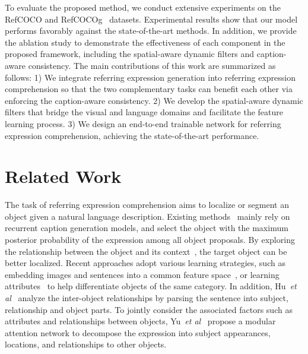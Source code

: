 \documentclass{bmvc2k}
\def\etal{\emph{et al}\bmvaOneDot}
\begin{document}
To evaluate the proposed method, we conduct extensive experiments on the RefCOCO \cite{Yu_ECCV_2016} and RefCOCOg~\cite{Mao_CVPR_2016,Nagaraja_ECCV_2016} datasets.
Experimental results show that our model performs favorably against the state-of-the-art methods.
In addition, we provide the ablation study to demonstrate the effectiveness of each component in the proposed framework, including the spatial-aware dynamic filters and caption-aware consistency.
The main contributions of this work are summarized as follows:
1) We integrate referring expression generation into referring expression comprehension so that the two complementary tasks can benefit each other via enforcing the caption-aware consistency.
2) We develop the spatial-aware dynamic filters that bridge the visual and language domains and facilitate the feature learning process.
3) We design an end-to-end trainable network for referring expression comprehension, achieving the state-of-the-art performance.












\section{Related Work}
{}
The task of referring expression comprehension aims to localize or segment an object given a natural language description.
Existing methods~\cite{Hu_CVPR_2016_2,Luo_CVPR_2017,Mao_CVPR_2016} mainly rely on recurrent caption generation models, and select the object with the maximum posterior probability of the expression among all object proposals.
By exploring the relationship between the object and its context~\cite{Nagaraja_ECCV_2016,Yu_ECCV_2016,Zhang_CVPR_2018}, the target object can be better localized.
Recent approaches adopt various learning strategies, such as embedding images and sentences into a common feature space~\cite{Wang_CVPR_2016,Rohrbach_ECCV_2016},
or learning attributes~\cite{Liu_ICCV_2017_2} to help differentiate objects of the same category.
In addition, Hu~\etal~\cite{Hu_CVPR_2017} analyze the inter-object relationships by parsing the sentence into subject, relationship and object parts.
To jointly consider the associated factors such as attributes and relationships between objects, Yu~\etal~\cite{Yu_CVPR_2018} propose a modular attention network to decompose the expression into subject appearances, locations, and relationships to other objects.
\end{document}
